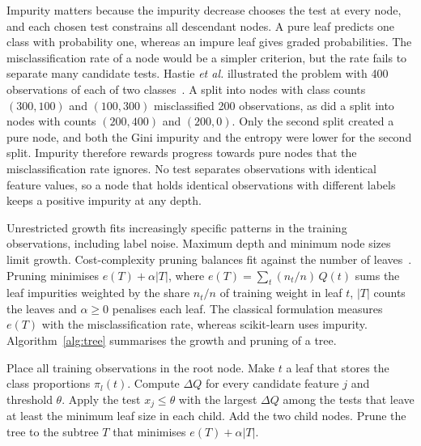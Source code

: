 \documentclass[conference]{IEEEtran}
\begin{document}
Impurity matters because the impurity decrease chooses the test at every node, and each chosen test constrains all descendant nodes. A pure leaf predicts one class with probability one, whereas an impure leaf gives graded probabilities. The misclassification rate of a node would be a simpler criterion, but the rate fails to separate many candidate tests. Hastie \emph{et al.} illustrated the problem with 400 observations of each of two classes~\cite{hastie2009}. A split into nodes with class counts $(300,100)$ and $(100,300)$ misclassified 200 observations, as did a split into nodes with counts $(200,400)$ and $(200,0)$. Only the second split created a pure node, and both the Gini impurity and the entropy were lower for the second split. Impurity therefore rewards progress towards pure nodes that the misclassification rate ignores. No test separates observations with identical feature values, so a node that holds identical observations with different labels keeps a positive impurity at any depth.

Unrestricted growth fits increasingly specific patterns in the training observations, including label noise. Maximum depth and minimum node sizes limit growth. Cost-complexity pruning balances fit against the number of leaves~\cite{breiman1984}. Pruning minimises $e(T) + \alpha|T|$, where $e(T)=\sum_t (n_t/n)\,Q(t)$ sums the leaf impurities weighted by the share $n_t/n$ of training weight in leaf $t$, $|T|$ counts the leaves and $\alpha \ge 0$ penalises each leaf. The classical formulation measures $e(T)$ with the misclassification rate, whereas scikit-learn uses impurity. Algorithm~\ref{alg:tree} summarises the growth and pruning of a tree.

\begin{algorithm}[!t]
    \caption{Growth and pruning of a classification tree}
    \label{alg:tree}
    \begin{algorithmic}[1]
        \STATE Place all training observations in the root node.
        \STATE Make $t$ a leaf that stores the class proportions $\pi_l(t)$.
        \ELSE
        \STATE Compute $\Delta Q$ for every candidate feature $j$ and threshold $\theta$.
        \STATE Apply the test $x_j \le \theta$ with the largest $\Delta Q$ among the tests that leave at least the minimum leaf size in each child.
        \STATE Add the two child nodes.
        \ENDIF
        \ENDFOR
        \STATE Prune the tree to the subtree $T$ that minimises $e(T) + \alpha|T|$.
    \end{algorithmic}
\end{algorithm}
\end{document}
